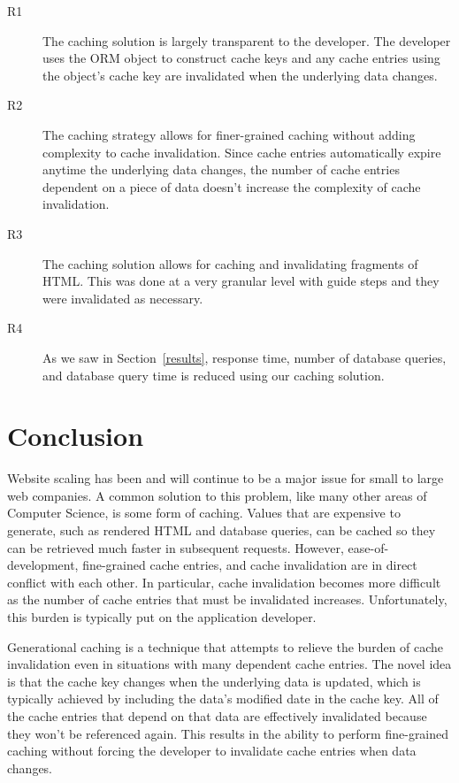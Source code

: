 \documentclass[12pt]{ucthesis}
\begin{document}
\begin{description}
   \item[R1] The caching solution is largely transparent to the developer.
             The developer uses the ORM object to construct cache keys and any cache entries using the object's cache key are invalidated when the underlying data changes.
   \item[R2] The caching strategy allows for finer-grained caching without adding complexity to cache invalidation.
             Since cache entries automatically expire anytime the underlying data changes, the number of cache entries dependent on a piece of data doesn't increase the complexity of cache invalidation.
   \item[R3] The caching solution allows for caching and invalidating fragments of HTML\@.
             This was done at a very granular level with guide steps and they were invalidated as necessary.
   \item[R4] As we saw in Section~\ref{results}, response time, number of database queries, and database query time is reduced using our caching solution.
\end{description}


\chapter{Conclusion} \label{conclusion}
Website scaling has been and will continue to be a major issue for small to large web companies.
A common solution to this problem, like many other areas of Computer Science, is some form of caching.
Values that are expensive to generate, such as rendered HTML and database queries, can be cached so they can be retrieved much faster in subsequent requests.
However, ease-of-development, fine-grained cache entries, and cache invalidation are in direct conflict with each other.
In particular, cache invalidation becomes more difficult as the number of cache entries that must be invalidated increases.
Unfortunately, this burden is typically put on the application developer.

Generational caching is a technique that attempts to relieve the burden of cache invalidation even in situations with many dependent cache entries.
The novel idea is that the cache key changes when the underlying data is updated, which is typically achieved by including the data's modified date in the cache key.
All of the cache entries that depend on that data are effectively invalidated because they won't be referenced again.
This results in the ability to perform fine-grained caching without forcing the developer to invalidate cache entries when data changes.
\end{document}
